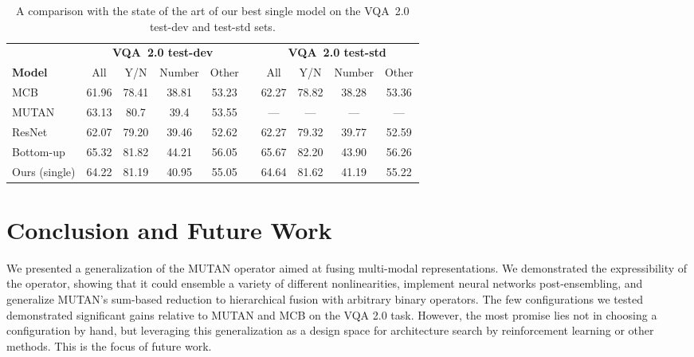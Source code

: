 \begin{table*}[!t]
\centering
\caption{A comparison with the state of the art of our best single model on the
         VQA~2.0 test-dev and test-std sets.}
\begin{tabular}{l*{9}{c}}
& \multicolumn{4}{c}{\textbf{VQA~2.0 test-dev}} & & \multicolumn{4}{c}{\textbf{VQA~2.0 test-std}} \\
\textbf{Model} & All & Y/N & Number & Other & & All & Y/N & Number & Other \\
\midrule
MCB\footnotemark{} & 61.96 & 78.41 & 38.81 & 53.23 & & 62.27 & 78.82 & 38.28 & 53.36 \\
MUTAN\footnotemark{} & 63.13 & 80.7 & 39.4 & 53.55 & & --- & --- & --- & --- \\
ResNet\footnotemark{} & 62.07 & 79.20 & 39.46 & 52.62 & & 62.27 & 79.32 & 39.77 & 52.59 \\
Bottom-up\footnotemark{} & 65.32 & 81.82 & 44.21 & 56.05 & & 65.67 & 82.20 & 43.90 & 56.26 \\
\midrule
Ours (single) & 64.22 & 81.19 & 40.95 & 55.05 & & 64.64 & 81.62 & 41.19 & 55.22 \\
\midrule
\end{tabular}
\label{tab:sota-comparison}
\end{table*}


\section{Conclusion and Future Work}

We presented a generalization of the MUTAN operator aimed at fusing multi-modal
representations. We demonstrated the expressibility of the operator, showing
that it could ensemble a variety of different nonlinearities, implement neural
networks post-ensembling, and generalize MUTAN's sum-based reduction to
hierarchical fusion with arbitrary binary operators. The few configurations we
tested demonstrated significant gains relative to MUTAN and MCB on the VQA 2.0
task. However, the most promise lies not in choosing a configuration by hand,
but leveraging this generalization as a design space for architecture search by
reinforcement learning or other methods. This is the focus of future work.

\FloatBarrier{}
